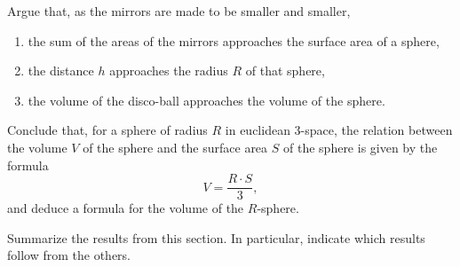 \documentclass[hints,handout,noauthor,nooutcomes,12pt,newpage]{ximera}
\begin{document}
\begin{problem}
Argue that, as the mirrors are made to be smaller and smaller,
\begin{enumerate}
\item the sum of the areas of the mirrors approaches the surface area of a sphere,
\item the distance $h$ approaches the radius $R$ of that sphere,
\item the volume of the disco-ball approaches the volume of the sphere.
\end{enumerate}
Conclude that, for a sphere of radius $R$ in euclidean $3$-space, the relation
between the volume $V$ of the sphere and the surface area $S$ of the sphere is
given by the formula%
\[
V=\frac{R\cdot S}{3},
\]
and deduce a formula for the volume of the $R$-sphere.

\end{problem}





\begin{problem}
Summarize the results from this section. In particular, indicate which
results follow from the others.
\begin{freeResponse}
\end{freeResponse}
\end{problem}
\end{document}
